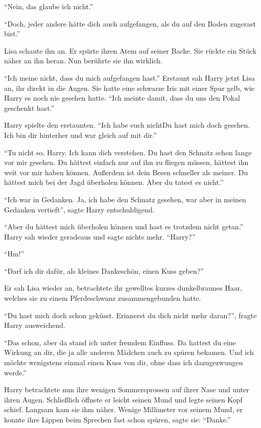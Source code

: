\enquote{Nein, das glaube ich nicht.}

\enquote{Doch, jeder andere hätte dich auch aufgefangen, als du auf den Boden zugerast bist.}

Lisa schaute ihn an. Er spürte ihren Atem auf seiner Backe. Sie rückte ein Stück näher an ihn heran. Nun berührte sie ihn wirklich.

\enquote{Ich meine nicht, dass du mich aufgefangen hast.} Erstaunt sah Harry jetzt Lisa an, ihr direkt in die Augen. Sie hatte eine schwarze Iris mit einer Spur gelb, wie Harry es noch nie gesehen hatte. \enquote{Ich meinte damit, dass du uns den Pokal geschenkt hast.}

Harry spielte den erstaunten. \enquote{Ich habe euch nicht\abs Du hast mich doch gesehen. Ich bin dir hinterher und war gleich auf mit dir.}

\enquote{Tu nicht so, Harry. Ich kann dich verstehen. Du hast den Schnatz schon lange vor mir gesehen. Du hättest einfach nur auf ihn zu fliegen müssen, hättest ihn weit vor mir haben können. Außerdem ist dein Besen schneller als meiner. Du hättest mich bei der Jagd überholen können. Aber du tatest es nicht.}

\enquote{Ich war in Gedanken. Ja, ich habe den Schnatz gesehen, war aber in meinen Gedanken vertieft}, sagte Harry entschuldigend.

\enquote{Aber du hättest mich überholen können und hast es trotzdem nicht getan.} Harry sah wieder geradeaus und sagte nichts mehr. \enquote{Harry?}

\enquote{Hm!}

\enquote{Darf ich dir dafür, als kleines Dankeschön, einen Kuss geben?}

Er sah Lisa wieder an, betrachtete ihr gewelltes kurzes dunkelbraunes Haar, welches sie zu einem Pferdeschwanz zusammengebunden hatte.

\enquote{Du hast mich doch schon geküsst. Erinnerst du dich nicht mehr daran?}, fragte Harry ausweichend.

\enquote{Das schon, aber da stand ich unter fremdem Einfluss. Da hattest du eine Wirkung an dir, die ja alle anderen Mädchen auch zu spüren bekamen. Und ich möchte wenigstens einmal einen Kuss von dir, ohne dass ich dazu\abs gezwungen werde.}

Harry betrachtete nun ihre wenigen Sommersprossen auf ihrer Nase und unter ihren Augen. Schließlich öffnete er leicht seinen Mund und legte seinen Kopf schief. Langsam kam sie ihm näher. Wenige Millimeter vor seinem Mund, er konnte ihre Lippen beim Sprechen fast schon spüren, sagte sie: \enquote{Danke.}

